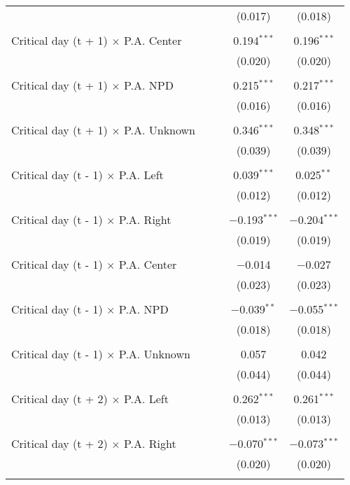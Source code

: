 \documentclass[
]{article}
\begin{document}
\begin{table}[!htbp]
{\begin{tabular}{@{\extracolsep{5pt}}lcccc}
  &  &  & (0.017) & (0.018) \\ 
  & & & & \\ 
 Critical day (t + 1) $\times$ P.A. Center &  &  & 0.194$^{***}$ & 0.196$^{***}$ \\ 
  &  &  & (0.020) & (0.020) \\ 
  & & & & \\ 
 Critical day (t + 1) $\times$ P.A. NPD &  &  & 0.215$^{***}$ & 0.217$^{***}$ \\ 
  &  &  & (0.016) & (0.016) \\ 
  & & & & \\ 
 Critical day (t + 1) $\times$ P.A. Unknown &  &  & 0.346$^{***}$ & 0.348$^{***}$ \\ 
  &  &  & (0.039) & (0.039) \\ 
  & & & & \\ 
 Critical day (t - 1) $\times$ P.A. Left &  &  & 0.039$^{***}$ & 0.025$^{**}$ \\ 
  &  &  & (0.012) & (0.012) \\ 
  & & & & \\ 
 Critical day (t - 1) $\times$ P.A. Right &  &  & $-$0.193$^{***}$ & $-$0.204$^{***}$ \\ 
  &  &  & (0.019) & (0.019) \\ 
  & & & & \\ 
 Critical day (t - 1) $\times$ P.A. Center &  &  & $-$0.014 & $-$0.027 \\ 
  &  &  & (0.023) & (0.023) \\ 
  & & & & \\ 
 Critical day (t - 1) $\times$ P.A. NPD &  &  & $-$0.039$^{**}$ & $-$0.055$^{***}$ \\ 
  &  &  & (0.018) & (0.018) \\ 
  & & & & \\ 
 Critical day (t - 1) $\times$ P.A. Unknown &  &  & 0.057 & 0.042 \\ 
  &  &  & (0.044) & (0.044) \\ 
  & & & & \\ 
 Critical day (t + 2) $\times$ P.A. Left &  &  & 0.262$^{***}$ & 0.261$^{***}$ \\ 
  &  &  & (0.013) & (0.013) \\ 
  & & & & \\ 
 Critical day (t + 2) $\times$ P.A. Right &  &  & $-$0.070$^{***}$ & $-$0.073$^{***}$ \\ 
  &  &  & (0.020) & (0.020) \\ 
  & & & & \\ 

\end{tabular}}
\end{table}
\end{document}
